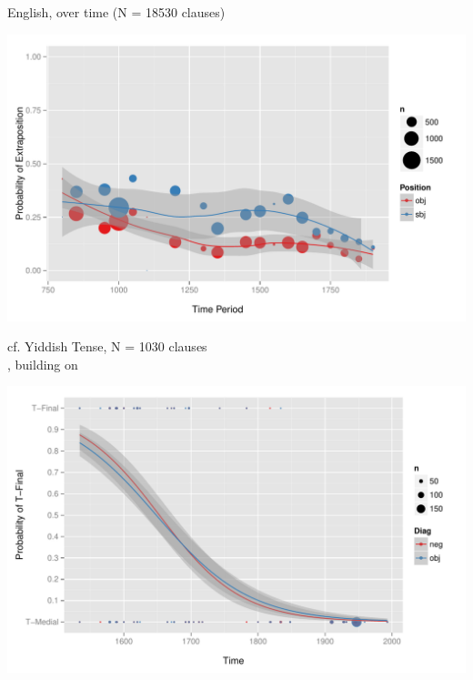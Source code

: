 \documentclass[hyperref={pdfpagelabels=false}]{beamer}
\begin{document}
\begin{frame}{English, over time (N = 18530 clauses)}

\begin{center}
\includegraphics[width=1.1\textwidth]{exSbjObjYearBinned50Loessymeb.pdf}
\end{center}
\end{frame}

\begin{frame}{cf. Yiddish Tense, N = 1030 clauses \\ \small{\citet{wallenberg2013}, building on \citet{santorini1993a}}}

\begin{center}
\includegraphics[width=1.05\textwidth]{yiddishLogistic.pdf}
\end{center}
\end{frame}
\end{document}
